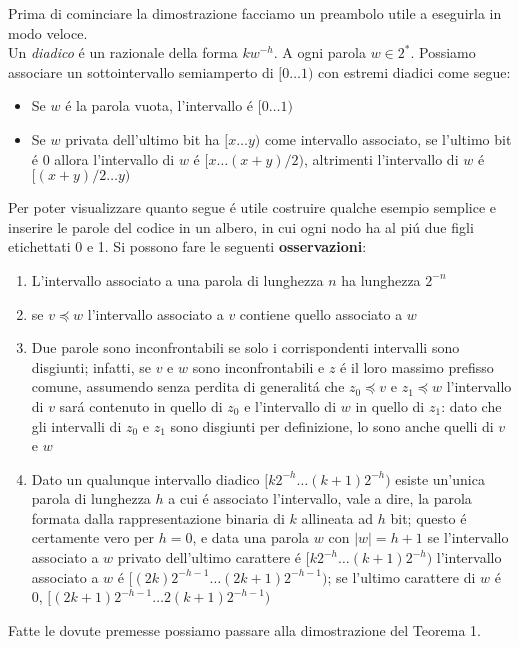 Prima di cominciare la dimostrazione facciamo un preambolo utile a eseguirla in modo veloce.\\
Un \textit{diadico} é un razionale della forma $kw^{-h}$. A ogni parola $w \in 2^*$. Possiamo associare un sottointervallo semiamperto di $[0\dots1)$ con estremi diadici come segue:
\begin{itemize}
    \item Se $w$ é la parola vuota, l'intervallo é $[0\dots1)$
    \item Se $w$ privata dell'ultimo bit ha $[x \dots y)$ come intervallo associato, se l'ultimo bit é 0 allora l'intervallo di $w$ é $[x \dots (x + y)/2)$, altrimenti l'intervallo di $w$ é $[(x + y)/2 \dots y)$
\end{itemize}
Per poter visualizzare quanto segue é utile costruire qualche esempio semplice e inserire le parole del codice in un albero, in cui ogni nodo ha al piú due figli etichettati 0 e 1. Si possono fare le seguenti \textbf{osservazioni}:
\begin{enumerate}
    \item L'intervallo associato a una parola di lunghezza $n$ ha lunghezza $2^{-n}$
    \item se $v \preceq w$ l'intervallo associato a $v$ contiene quello associato a $w$
    \item Due parole sono inconfrontabili se solo i corrispondenti intervalli sono disgiunti; infatti, se $v$ e $w$ sono inconfrontabili e $z$ é il loro massimo prefisso comune, assumendo senza perdita di generalitá che $z_0 \preceq v$ e $z_1 \preceq w$ l'intervallo di $v$ sará contenuto in quello di $z_0$ e l'intervallo di $w$ in quello di $z_1$: dato che gli intervalli di $z_0$ e $z_1$ sono disgiunti per definizione, lo sono anche quelli di $v$ e $w$
    \item Dato un qualunque intervallo diadico $[k2^{-h} \dots (k + 1)2^{-h})$ esiste un'unica parola di lunghezza $h$ a cui é associato l'intervallo, vale a dire, la parola formata dalla rappresentazione binaria di $k$ allineata ad $h$ bit; questo é certamente vero per $h = 0$, e data una parola $w$ con $|w| = h + 1$ se l'intervallo associato a $w$ privato dell'ultimo carattere é $[k2^{-h} \dots (k + 1)2^{-h})$ l'intervallo associato a $w$ é $[(2k)2^{-h-1} \dots (2k + 1)2^{-h-1})$; se l'ultimo carattere di $w$ é 0, $[(2k + 1)2^{-h-1} \dots 2(k + 1)2^{-h-1})$
\end{enumerate}
Fatte le dovute premesse possiamo passare alla dimostrazione del Teorema 1.\\
